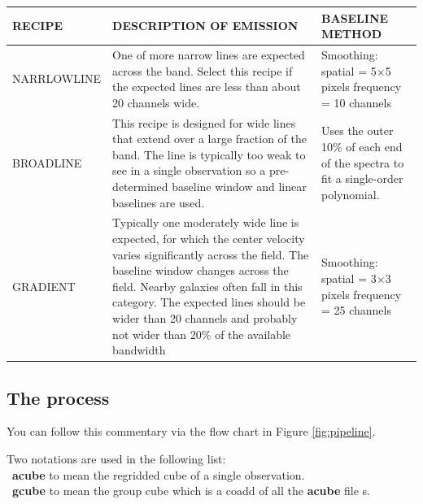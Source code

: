 \documentclass[twoside,11pt]{article}
\newcommand{\xlabel}[1]{}
\renewcommand{\_}{\texttt{\symbol{95}}}
\begin{document}
\begin{table}[h!]
\begin{tabular}{p{2.9cm}|p{7.3cm}|p{4.5cm}}
\hline
\textbf{RECIPE} & \textbf{DESCRIPTION OF EMISSION} & \textbf{BASELINE METHOD} \\
\hline
NARRLOWLINE & One of more narrow lines are expected across the band. Select this recipe if the expected lines are less than about 20 channels wide.& Smoothing: \newline spatial = 5$\times$5 pixels \newline frequency = 10 channels\\
\hline
BROADLINE &This recipe is designed for wide lines that extend over a large fraction of the band. The line is typically too weak to see in a single observation so a pre-determined baseline window and linear baselines are used.  &Uses the outer 10\% of each end of the spectra to fit a single-order polynomial.  \\
\hline
GRADIENT &Typically one moderately wide line is expected, for which the center velocity varies significantly across the field. The baseline window changes across the field. Nearby galaxies often fall in this category. The expected lines should be wider than 20 channels and probably not wider than 20\% of the available bandwidth  & Smoothing: \newline spatial = 3$\times$3 pixels  \newline frequency = 25 channels\\
\hline
\end{tabular}
\end{table}

\subsection{\xlabel{recipes}The process}
You can follow this commentary via the flow chart in Figure \ref{fig:pipeline}.

Two notations are used in the following list:\\ 
\textbullet\ \textbf{a\_cube} to mean the regridded cube of a single observation. \\
\textbullet\ \textbf{g\_cube} to mean the group cube which is a coadd of all the \textbf{a\_cube} file s.
\end{document}
